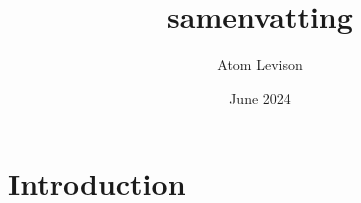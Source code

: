 \documentclass{article}
\title{samenvatting}
\author{Atom Levison}
\date{June 2024}
\begin{document}
\maketitle

\section{Introduction}
\end{document}
